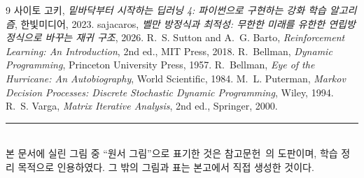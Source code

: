 \documentclass[11pt,a4paper]{article}
\begin{document}
\begin{thebibliography}{9}
사이토 고키, \emph{밑바닥부터 시작하는 딥러닝 4: 파이썬으로 구현하는 강화 학습 알고리즘}, 한빛미디어, 2023.
sajacaros, \emph{벨만 방정식과 최적성: 무한한 미래를 유한한 연립방정식으로 바꾸는 재귀 구조}, 2026.
R.~S. Sutton and A.~G. Barto, \emph{Reinforcement Learning: An Introduction}, 2nd ed., MIT Press, 2018.
R.~Bellman, \emph{Dynamic Programming}, Princeton University Press, 1957.
R.~Bellman, \emph{Eye of the Hurricane: An Autobiography}, World Scientific, 1984.
M.~L. Puterman, \emph{Markov Decision Processes: Discrete Stochastic Dynamic Programming}, Wiley, 1994.
R.~S. Varga, \emph{Matrix Iterative Analysis}, 2nd ed., Springer, 2000.
\end{thebibliography}

\vspace{4mm}
\noindent\rule{\linewidth}{0.4pt}\\
\footnotesize
본 문서에 실린 그림 중 ``원서 그림''으로 표기한 것은 참고문헌~\cite{dlfs4}의 도판이며, 학습 정리 목적으로
인용하였다. 그 밖의 그림과 표는 본고에서 직접 생성한 것이다.
\end{document}
